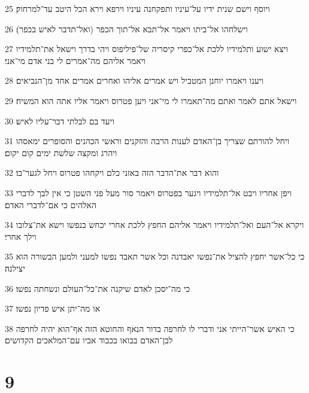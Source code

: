 \par 25 ויוסף וישם שנית ידיו על־עיניו ותפקחנה עיניו וירפא וירא הכל היטב עד־למרחוק׃
\par 26 וישלחהו אל־ביתו ויאמר אל־תבא אל־תוך הכפר (ואל־תדבר לאיש בכפר)׃
\par 27 ויצא ישוע ותלמידיו ללכת אל־כפרי קיסריה של־פיליפוס ויהי בדרך וישאל את־תלמידיו ויאמר אליהם מה־אמרים לי בני אדם מי־אני׃
\par 28 ויענו ויאמרו יוחנן המטביל ויש אמרים אליהו ואחרים אמרים אחד מן־הנביאים׃
\par 29 וישאל אתם לאמר ואתם מה־תאמרו לי מי־אני ויען פטרוס ויאמר אליו אתה הוא המשיח׃
\par 30 ויעד בם לבלתי דבר־עליו לאיש׃
\par 31 ויחל להורתם שצריך בן־האדם לענות הרבה והזקנים וראשי הכהנים והסופרים ימאסהו ויהרג ומקצה שלשת ימים קום יקום׃
\par 32 והוא דבר את־הדבר הזה באזני כלם ויקחהו פטרוס ויחל לגער־בו׃
\par 33 ויפן אחריו ויבט אל־תלמידיו ויגער בפטרוס ויאמר סור מעל פני השטן כי אין לבך לדברי האלהים כי אם־לדברי האדם׃
\par 34 ויקרא אל־העם ואל־תלמידיו ויאמר אליהם החפץ ללכת אחרי יכחש בנפשו וישא את־צלובו וילך אחרי׃
\par 35 כי כל־אשר יחפץ להציל את־נפשו יאבדנה וכל אשר תאבד נפשו למעני ולמען הבשורה הוא יצילנה׃
\par 36 כי מה־יסכן לאדם שיקנה את־כל־העולם ונשחתה נפשו׃
\par 37 או מה־יתן איש פדיון נפשו׃
\par 38 כי האיש אשר־הייתי אני ודברי לו לחרפה בדור הנאף והחוטא הזה אף־הוא יהיה לחרפה לבן־האדם בבואו בכבוד אביו עם־המלאכים הקדושים׃

\chapter{9}

